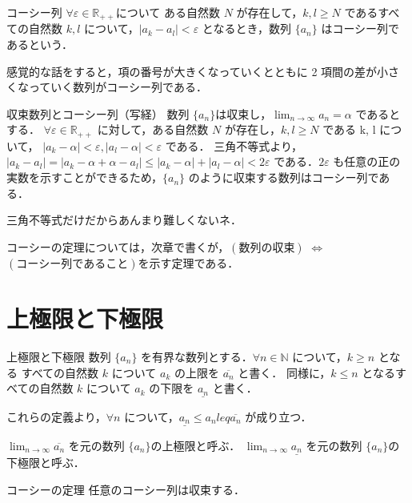 \documentclass[a4paper]{ltjsarticle}
\begin{document}
\begin{tcb}{コーシー列}{}
$\forall \varepsilon \in \mathbb{R_{++}}$について ある自然数 $N$ が存在して，$k, l \geq N$ であるすべての自然数 $k, l$
について，$|a_k - a_l| < \varepsilon$ となるとき，数列 $\{a_n\}$ はコーシー列であるという．
\end{tcb}
感覚的な話をすると，項の番号が大きくなっていくとともに 2 項間の差が小さくなっていく数列がコーシー列である．

\begin{theorem}{収束数列とコーシー列（写経）}{}
数列 $\{a_n\} は収束し，\lim_{n \rightarrow \infty} a_n = \alpha$ であるとする．
$\forall\varepsilon \in \mathbb{R_{++}}$ に対して，ある自然数 $N$ が存在し，$k, l \geq N$ である \forall k, \forall l について，
$|a_k - \alpha| < \varepsilon, |a_l - \alpha| < \varepsilon$ である．
三角不等式より，$|a_k - a_l| = |a_k - \alpha + \alpha - a_l| \leq |a_k - \alpha| + |a_l - \alpha| < 2 \varepsilon$
である．$2\varepsilon$ も任意の正の実数を示すことができるため，$\{a_n\}$ のように収束する数列はコーシー列である．
\end{theorem}
三角不等式だけだからあんまり難しくないネ．

コーシーの定理については，次章で書くが，$(数列の収束)$ $\Leftrightarrow$ $(コーシー列であること)$を示す定理である．
\section{上極限と下極限}

\begin{tcb}{上極限と下極限}{}
数列 $\{a_n\}$ を有界な数列とする．$\forall n \in \mathbb{N}$ について，$k \geq n$ となる すべての自然数 $k$ について $a_k$ の上限を $\overline{a_n}$ と書く． 
同様に，$k \leq n$ となるすべての自然数 $k$ について $a_k$ の下限を $\underline{a_n}$ と書く．

これらの定義より，$\forall n$ について，$\underline{a_n} \leq a_n leq \overline{a_n}$ が成り立つ．

$\lim_{n \to \infty} \overline{a_n}$ を元の数列 $\{a_n\} $の上極限と呼ぶ．
$\lim_{n \to \infty} \underline{a_n}$ を元の数列 $\{a_n\} $の下極限と呼ぶ．

\end{tcb}

\begin{theorem}{コーシーの定理}{}
任意のコーシー列は収束する．
\end{theorem}
\end{document}
